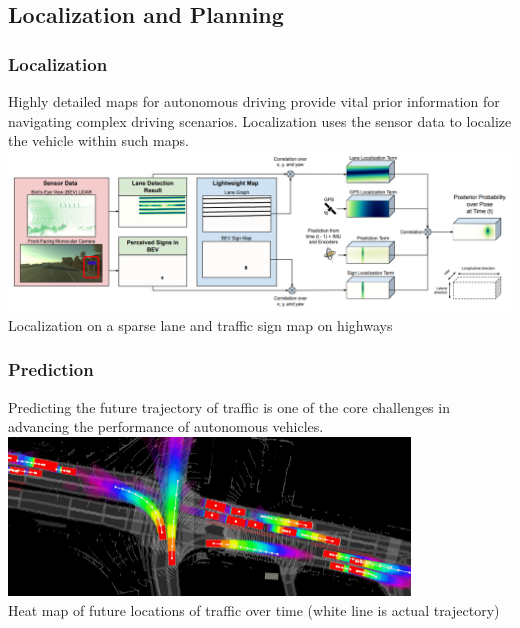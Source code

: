 
\subsection{Localization and Planning}

\begin{frame}
\frametitle{Localization}
Highly detailed maps for autonomous driving provide vital prior information
for navigating complex driving scenarios. Localization uses the sensor data
to localize the vehicle within such maps.\\
\vspace{0.25cm}
\centering
\includegraphics[width=\textwidth]{images/uber_sparse_localization.png}\\
\footnotesize{Localization on a sparse lane and traffic sign map on highways \cite{Ma2019}}
\end{frame}

\begin{frame}
\frametitle{Prediction}
Predicting the future trajectory of traffic is one of the core challenges in
advancing the performance of autonomous vehicles.\\
\vspace{0.25cm}
\centering
\includegraphics[width=0.8\textwidth]{images/uber_prediction.png}\\
\vspace{0.2cm}
\footnotesize{Heat map of future locations of traffic over time
      (white line is actual trajectory) \cite{Casas2020}}
\end{frame}


